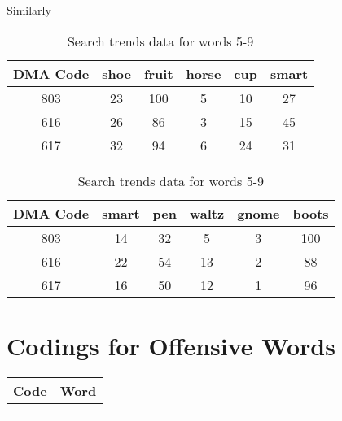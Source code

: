 \documentclass{article}
\begin{document}
Similarly

\begin{table}[!htb]
    \caption{Example Raw Data From Google Trends}
    \begin{minipage}{.6\linewidth}
        \centering
        \begin{tabular}{|c|c|c|c|c|c|}
            \hline
            DMA Code           & shoe & fruit & horse & cup & smart \\ \hline
            803   & 23          & 100     & 5           & 10            & 27         \\ \hline
            616   & 26          & 86      & 3           & 15            & 45         \\ \hline
            617         & 32          & 94      & 6           & 24            & 31 \\ \hline
        \end{tabular}
        \caption{Search trends data for words 1-5}
    \end{minipage}%
    \begin{minipage}{.6\linewidth}
        \centering
        \begin{tabular}{|c|c|c|c|c|c|}
            \hline
            DMA Code           & smart & pen & waltz & gnome & boots \\ \hline
            803   & 14         & 32    & 5       & 3       & 100     \\ \hline
            616   & 22         & 54    & 13      & 2       & 88      \\ \hline
            617         & 16         & 50    & 12      & 1       & 96      \\ \hline
        \end{tabular}
        \caption{Search trends data for words 5-9}
    \end{minipage}
\end{table}



\printbibliography{}
\appendix
\section{Codings for Offensive Words}
\begin{centering}
\begin{table}[]
    \begin{tabular}{|l|l|} \\ \hline
    Code & Word \\ \hline
         &      \\ \hline
         &      \\ \hline
\end{tabular}
\end{table}
\end{centering}
\end{document}
